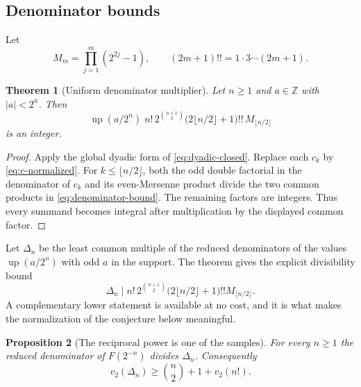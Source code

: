 \documentclass[11pt,oneside]{article}
\newtheorem{theorem}{Theorem}[section]
\newtheorem{proposition}[theorem]{Proposition}
\theoremstyle{definition}
\theoremstyle{remark}
\newcommand{\Z}{\mathbb Z}
\newcommand{\Up}{\operatorname{up}}
\newcommand{\vtwo}{v_2}
\begin{document}
\subsection{Denominator bounds}

Let
\begin{equation}
 M_m=\prod_{j=1}^{m}(2^{2j}-1),
 \qquad (2m+1)!!=1\cdot3\cdots(2m+1).                     \label{eq:denominator-products}
\end{equation}

\begin{theorem}[Uniform denominator multiplier]
Let $n\ge1$ and $a\in\Z$ with $|a|<2^n$.  Then
\begin{equation}
 \Up(a/2^n)\;n!\,2^{\binom{n+1}{2}}
 \bigl(2\lfloor n/2\rfloor+1\bigr)!!\,
 M_{\lfloor n/2\rfloor}                                  \label{eq:denominator-bound}
\end{equation}
is an integer.
\end{theorem}

\begin{proof}
Apply the global dyadic form of \eqref{eq:dyadic-closed}.  Replace each $c_k$ by
\eqref{eq:c-normalized}.  For $k\le\lfloor n/2\rfloor$, both the odd double factorial in the
denominator of $c_k$ and its even-Mersenne product divide the two common products in
\eqref{eq:denominator-bound}.  The remaining factors are integers.  Thus every summand becomes
integral after multiplication by the displayed common factor.
\end{proof}

Let $\Delta_n$ be the least common multiple of the reduced denominators of the values
$\Up(a/2^n)$ with odd $a$ in the support.  The theorem gives the explicit divisibility bound
\begin{equation}
 \Delta_n\mid n!\,2^{\binom{n+1}{2}}
 \bigl(2\lfloor n/2\rfloor+1\bigr)!!M_{\lfloor n/2\rfloor}. \label{eq:lcm-bound}
\end{equation}
A complementary lower statement is available at no cost, and it is what makes the
normalization of the conjecture below meaningful.

\begin{proposition}[The reciprocal power is one of the samples]
\label{prop:dy-delta-lower}
For every $n\ge1$ the reduced denominator of $F(2^{-n})$ divides $\Delta_n$.  Consequently
\begin{equation}
 \vtwo(\Delta_n)\ge\binom n2+1+\vtwo(n!).                  \label{eq:dy-delta-lower}
\end{equation}
\end{proposition}
\end{document}
